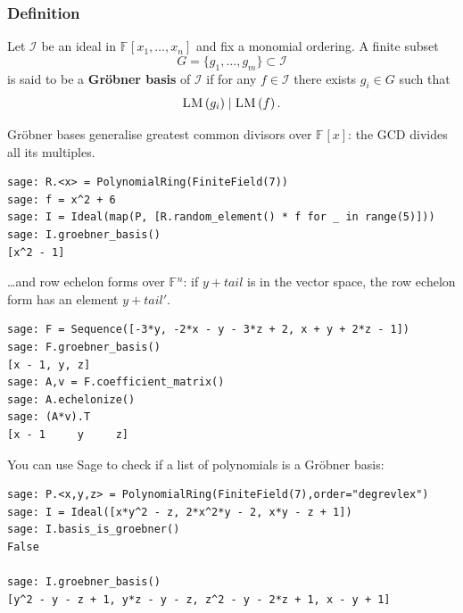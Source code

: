 \documentclass[9pt]{beamer}
\newcommand{\F}[1][]{\ensuremath{\mathbb{F}_{#1}}\xspace}
\newcommand{\I}{\ensuremath{\mathcal{I}}\xspace}
\newcommand{\gens}{\ensuremath{x_1,\dots,x_{n}}\xspace}
\newcommand{\LM}[1]{\ensuremath{\textsc{LM}\left(#1\right)}\xspace}
\begin{document}
\begin{frame}
\frametitle{Definition}
\begin{definition}
Let $\I$ be an ideal in $\F{}[\gens]$ and fix a monomial ordering. A finite subset $$G = \{g_1 ,\dots , g_{m} \} \subset \I$$  is said to be a \textbf{Gr\"obner basis} of $\I$ if for any $f \in \I$ there exists $g_i \in G$ such that $$\LM{g_i} \mid \LM{f}.$$
\end{definition} 

\framebreak

Gröbner bases generalise greatest common divisors over $\F{}[x]$: the GCD divides all its multiples.

\begin{lstlisting}
sage: R.<x> = PolynomialRing(FiniteField(7))
sage: f = x^2 + 6
sage: I = Ideal(map(P, [R.random_element() * f for _ in range(5)]))
sage: I.groebner_basis()
[x^2 - 1]
\end{lstlisting}

\framebreak

\dots and row echelon forms over $\F{}^n$: if $y + tail$ is in the vector space, the row echelon form has an element $y + tail'$. 
\begin{lstlisting}
sage: F = Sequence([-3*y, -2*x - y - 3*z + 2, x + y + 2*z - 1])
sage: F.groebner_basis()
[x - 1, y, z]
sage: A,v = F.coefficient_matrix()
sage: A.echelonize()
sage: (A*v).T
[x - 1     y     z]
\end{lstlisting}

\framebreak

You can use Sage to check if a list of polynomials is a Gröbner basis:

\begin{lstlisting}
sage: P.<x,y,z> = PolynomialRing(FiniteField(7),order="degrevlex")
sage: I = Ideal([x*y^2 - z, 2*x^2*y - 2, x*y - z + 1])
sage: I.basis_is_groebner()
False

sage: I.groebner_basis()
[y^2 - y - z + 1, y*z - y - z, z^2 - y - 2*z + 1, x - y + 1]
\end{lstlisting}


\end{frame}
\end{document}
